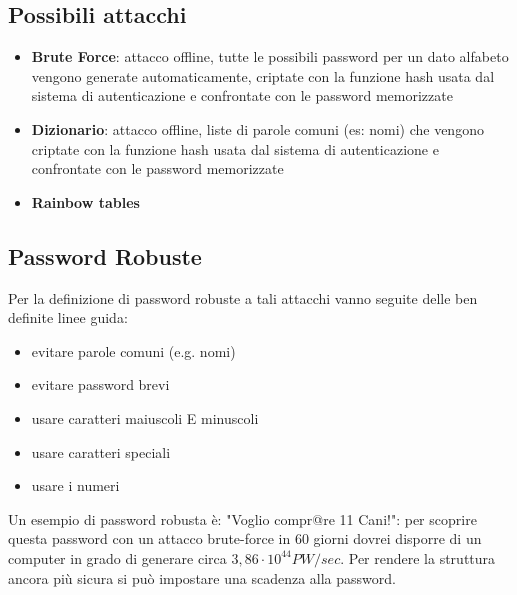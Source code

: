 \subsection{Possibili attacchi}
\begin{itemize} 
  \item \textbf{Brute Force}: attacco offline, tutte le possibili password per un dato alfabeto vengono generate automaticamente, criptate con la funzione hash usata dal sistema di autenticazione e confrontate con le password memorizzate
  \item \textbf{Dizionario}: attacco offline, liste di parole comuni (es: nomi) che vengono criptate con la funzione hash usata dal sistema di autenticazione e confrontate con le password memorizzate
  \item \textbf{Rainbow tables}
\end{itemize}
\subsection{Password Robuste}
Per la definizione di password robuste a tali attacchi vanno seguite delle ben definite linee guida:
\begin{itemize}
  \item evitare parole comuni (e.g. nomi)
  \item evitare password brevi
  \item usare caratteri maiuscoli E minuscoli
  \item usare caratteri speciali
  \item usare i numeri
\end{itemize}
Un esempio di password robusta è: "Voglio compr@re 11 Cani!": per scoprire questa password con un attacco brute-force in 60 giorni dovrei disporre di un computer in grado di generare circa $3,86 \cdot 10^{44} PW/sec$. Per rendere la struttura ancora più sicura si può impostare una scadenza alla password.
